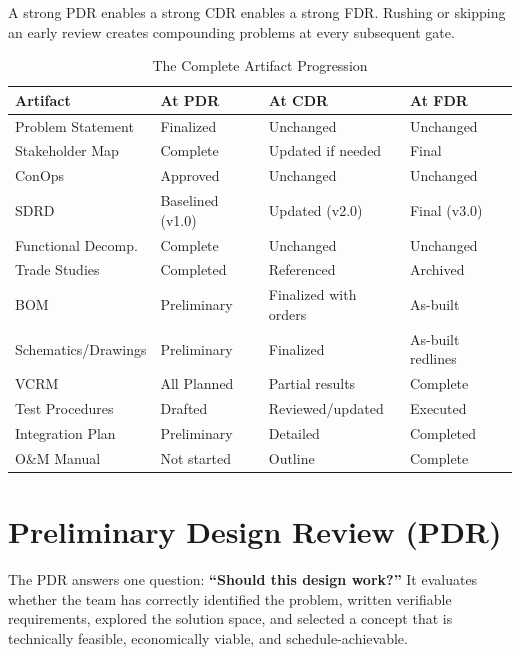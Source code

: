 \documentclass[11pt,letterpaper,twoside,openany]{book}
\begin{document}
A strong PDR enables a strong CDR enables a strong FDR. Rushing or skipping an early review creates compounding problems at every subsequent gate.


\begin{table}[htbp]\centering\small
\caption{The Complete Artifact Progression}
\begin{tabularx}{\textwidth}{l X X X}
\toprule
\textbf{Artifact} & \textbf{At PDR} & \textbf{At CDR} & \textbf{At FDR} \\
\midrule
Problem Statement & Finalized & Unchanged & Unchanged \\
Stakeholder Map & Complete & Updated if needed & Final \\
ConOps & Approved & Unchanged & Unchanged \\
SDRD & Baselined (v1.0) & Updated (v2.0) & Final (v3.0) \\
Functional Decomp.\ & Complete & Unchanged & Unchanged \\
Trade Studies & Completed & Referenced & Archived \\
BOM & Preliminary & Finalized with orders & As-built \\
Schematics/Drawings & Preliminary & Finalized & As-built redlines \\
VCRM & All Planned & Partial results & Complete \\
Test Procedures & Drafted & Reviewed/updated & Executed \\
Integration Plan & Preliminary & Detailed & Completed \\
O\&M Manual & Not started & Outline & Complete \\
\bottomrule
\end{tabularx}
\end{table}


\chapter{Preliminary Design Review (PDR)}

\vspace{1em}

The PDR answers one question: \textbf{``Should this design work?''} It evaluates whether the team has correctly identified the problem, written verifiable requirements, explored the solution space, and selected a concept that is technically feasible, economically viable, and schedule-achievable.

\vspace{1em}
\end{document}
